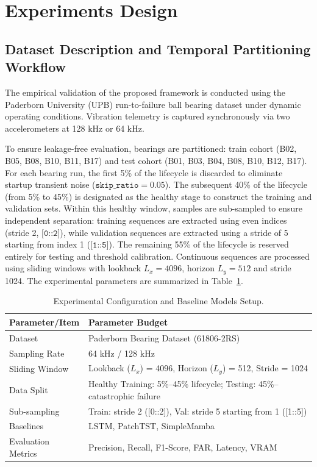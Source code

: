 \documentclass[runningheads]{llncs}
\begin{document}
\section{Experiments Design} \label{sect:s4}

\subsection{Dataset Description and Temporal Partitioning Workflow} \label{sect:s4dot1}
The empirical validation of the proposed framework is conducted using the Paderborn University (UPB) run-to-failure ball bearing dataset under dynamic operating conditions. Vibration telemetry is captured synchronously via two accelerometers at 128 kHz or 64 kHz.

To ensure leakage-free evaluation, bearings are partitioned: train cohort (B02, B05, B08, B10, B11, B17) and test cohort (B01, B03, B04, B08, B10, B12, B17). For each bearing run, the first 5\% of the lifecycle is discarded to eliminate startup transient noise ($\texttt{skip\_ratio} = 0.05$). The subsequent 40\% of the lifecycle (from 5\% to 45\%) is designated as the healthy stage to construct the training and validation sets. Within this healthy window, samples are sub-sampled to ensure independent separation: training sequences are extracted using even indices (stride 2, $\texttt{[0::2]}$), while validation sequences are extracted using a stride of 5 starting from index 1 ($\texttt{[1::5]}$). The remaining 55\% of the lifecycle is reserved entirely for testing and threshold calibration. Continuous sequences are processed using sliding windows with lookback $L_x = 4096$, horizon $L_y = 512$ and stride 1024. The experimental parameters are summarized in Table~\ref{tabref:table-3}.

\begin{table}[htbp]
\caption{Experimental Configuration and Baseline Models Setup.}
\label{tabref:table-3}
\centering
\footnotesize
\begin{tabular}{|p{3.5cm}|p{8.2cm}|}
\hline
\textbf{Parameter/Item} & \textbf{Parameter Budget} \\ \hline
Dataset & Paderborn Bearing Dataset (61806-2RS) \\ \hline
Sampling Rate & 64 kHz / 128 kHz \\ \hline
Sliding Window & Lookback ($L_x$) = 4096, Horizon ($L_y$) = 512, Stride = 1024 \\ \hline
Data Split & Healthy Training: 5\%–45\% lifecycle; Testing: 45\%--catastrophic failure \\ \hline
Sub-sampling & Train: stride 2 ([0::2]), Val: stride 5 starting from 1 ([1::5]) \\ \hline
Baselines & LSTM, PatchTST, SimpleMamba \\ \hline
Evaluation Metrics & Precision, Recall, F1-Score, FAR, Latency, VRAM \\ \hline
\end{tabular}
\end{table}
\end{document}

